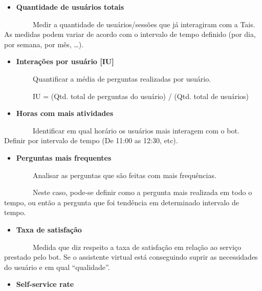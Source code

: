 \begin{itemize}
\tightlist
\item
  \textbf{Quantidade de usuários totais}
\end{itemize}

    Medir a quantidade de usuários/sessões que já interagiram com a
Tais. As medidas podem variar de acordo com o intervalo de tempo
definido (por dia, por semana, por mês, \ldots{}).

\begin{itemize}
\tightlist
\item
  \textbf{Interações por usuário {[}IU{]}}
\end{itemize}

    Quantificar a média de perguntas realizadas por usuário.

    IU = (Qtd. total de perguntas do usuário) / (Qtd. total de usuários)

\begin{itemize}
\tightlist
\item
  \textbf{Horas com mais atividades}
\end{itemize}

    Identificar em qual horário os usuários mais interagem com o bot.
Definir por intervalo de tempo (De 11:00 as 12:30, etc).

\begin{itemize}
\tightlist
\item
  \textbf{Perguntas mais frequentes}
\end{itemize}

    Analisar as perguntas que são feitas com mais frequências.

    Neste caso, pode-se definir como a pergunta mais realizada em todo o
tempo, ou então a pergunta que foi tendência em determinado intervalo de
tempo.

\begin{itemize}
\tightlist
\item
  \textbf{Taxa de satisfação}
\end{itemize}

    Medida que diz respeito a taxa de satisfação em relação ao serviço
prestado pelo bot. Se o assistente virtual está conseguindo suprir as
necessidades do usuário e em qual ``qualidade''.

\begin{itemize}
\tightlist
\item
  \textbf{Self-service rate}
\end{itemize}

